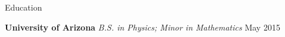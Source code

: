 \documentclass{resume} %
\begin{document}

\begin{rSection}{Education}
	
	{\bf University of Arizona} {\em B.S. in Physics; Minor in Mathematics} \hfill {May 2015} \\ 
	\nolinebreak	
	
\end{rSection}


%	
%




\end{document}
